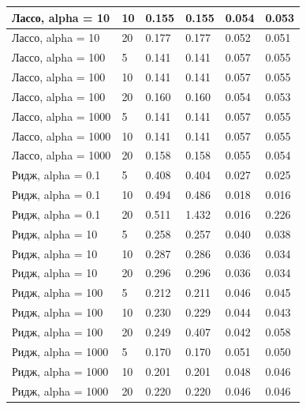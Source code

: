 \documentclass[12pt]{report}
\begin{document}
\begin{table}[!h]
\begin{center}
\begin{tabular}{|l|l|l|l|l|l|}
\hline Лассо, alpha = 10 & 10 & 0.155 & 0.155 & 0.054 & 0.053 \\
\hline Лассо, alpha = 10 & 20 & 0.177 & 0.177 & 0.052 & 0.051 \\
\hline Лассо, alpha = 100 & 5 & 0.141 & 0.141 & 0.057 & 0.055 \\
\hline Лассо, alpha = 100 & 10 & 0.141 & 0.141 & 0.057 & 0.055 \\
\hline Лассо, alpha = 100 & 20 & 0.160 & 0.160 & 0.054 & 0.053 \\
\hline Лассо, alpha = 1000 & 5 & 0.141 & 0.141 & 0.057 & 0.055 \\
\hline Лассо, alpha = 1000 & 10 & 0.141 & 0.141 & 0.057 & 0.055 \\
\hline Лассо, alpha = 1000 & 20 & 0.158 & 0.158 & 0.055 & 0.054 \\
\hline Ридж, alpha = 0.1 & 5 & 0.408 & 0.404 & 0.027 & 0.025 \\
\hline Ридж, alpha = 0.1 & 10 & 0.494 & 0.486 & 0.018 & 0.016 \\
\hline Ридж, alpha = 0.1 & 20 & 0.511 & 1.432 & 0.016 & 0.226 \\
\hline Ридж, alpha = 10 & 5 & 0.258 & 0.257 & 0.040 & 0.038 \\
\hline Ридж, alpha = 10 & 10 & 0.287 & 0.286 & 0.036 & 0.034 \\
\hline Ридж, alpha = 10 & 20 & 0.296 & 0.296 & 0.036 & 0.034 \\
\hline Ридж, alpha = 100 & 5 & 0.212 & 0.211 & 0.046 & 0.045 \\
\hline Ридж, alpha = 100 & 10 & 0.230 & 0.229 & 0.044 & 0.043 \\
\hline Ридж, alpha = 100 & 20 & 0.249 & 0.407 & 0.042 & 0.058 \\
\hline Ридж, alpha = 1000 & 5 & 0.170 & 0.170 & 0.051 & 0.050 \\
\hline Ридж, alpha = 1000 & 10 & 0.201 & 0.201 & 0.048 & 0.046 \\
\hline Ридж, alpha = 1000 & 20 & 0.220 & 0.220 & 0.046 & 0.046 \\
\hline
	\end{tabular}
	\end{center}
\end{table}

\printbibliography[title={СПИСОК ИСПОЛЬЗОВАННЫХ\\ ИСТОЧНИКОВ}]
\end{document}

